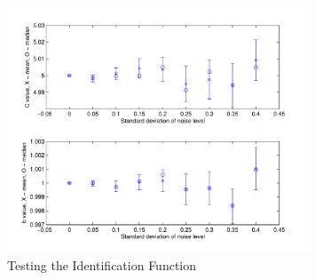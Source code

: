 \begin{figure}
\centering
\includegraphics[width=0.8\textwidth]{images/section-3b}
\caption{Testing the Identification Function\label{3b-fig}}
\end{figure}
